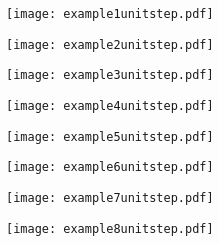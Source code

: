 \documentclass[grid, poker_landscape]{flashcards}
\begin{document}
    \begin{flashcard}{ \begin{dmath*}  \end{dmath*} }
        \texttt{[image: example1unitstep.pdf]}
    \end{flashcard}

    \begin{flashcard}{ \begin{dmath*}  \end{dmath*} }
        \texttt{[image: example2unitstep.pdf]}
    \end{flashcard}

    \begin{flashcard}{ \begin{dmath*}  \end{dmath*} }
        \texttt{[image: example3unitstep.pdf]}
    \end{flashcard}

    \begin{flashcard}{ \begin{dmath*}  \end{dmath*} }
        \texttt{[image: example4unitstep.pdf]}
    \end{flashcard}

    \begin{flashcard}{ \begin{dmath*}  \end{dmath*} }
        \texttt{[image: example5unitstep.pdf]}
    \end{flashcard}

    \begin{flashcard}{ \begin{dmath*}  \end{dmath*} }
        \texttt{[image: example6unitstep.pdf]}
    \end{flashcard}

    \begin{flashcard}{ \begin{dmath*}  \end{dmath*} }
        \texttt{[image: example7unitstep.pdf]}
    \end{flashcard}

    \begin{flashcard}{ \begin{dmath*}  \end{dmath*} }
        \texttt{[image: example8unitstep.pdf]}
    \end{flashcard}
\end{document}
